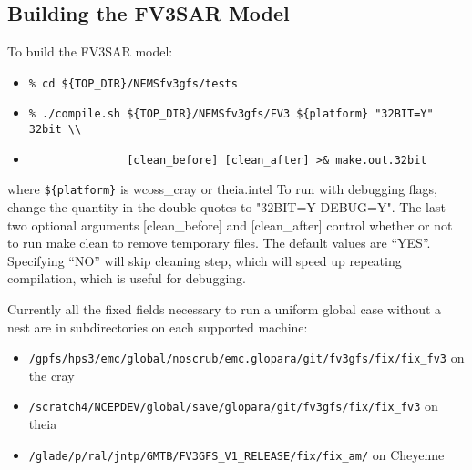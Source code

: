 \subsection{Building the FV3SAR Model}

To build the FV3SAR model:

\begin{itemize}
  \item[] \verb|% cd ${TOP_DIR}/NEMSfv3gfs/tests| 
  \item[] \verb|% ./compile.sh ${TOP_DIR}/NEMSfv3gfs/FV3 ${platform} "32BIT=Y" 32bit \\|
  \item[] \verb|               [clean_before] [clean_after] >& make.out.32bit|
\end{itemize}

where \verb|${platform}| is wcoss\_cray or theia.intel  To run with debugging flags, change the quantity in
the double quotes to "32BIT=Y DEBUG=Y".  The last two optional arguments [clean\_before] and [clean\_after]
control whether or not to run make clean to remove temporary files. The default values are “YES”. Specifying
“NO” will skip cleaning step, which will speed up repeating compilation, which is useful for debugging.

Currently all the fixed fields necessary to run a uniform global case without a nest are in subdirectories
on each supported machine:

\begin{itemize}
  \item[] \verb|/gpfs/hps3/emc/global/noscrub/emc.glopara/git/fv3gfs/fix/fix_fv3| on the cray
  \item[] \verb|/scratch4/NCEPDEV/global/save/glopara/git/fv3gfs/fix/fix_fv3| on theia
  \item[] \verb|/glade/p/ral/jntp/GMTB/FV3GFS_V1_RELEASE/fix/fix_am/| on Cheyenne
\end{itemize}

